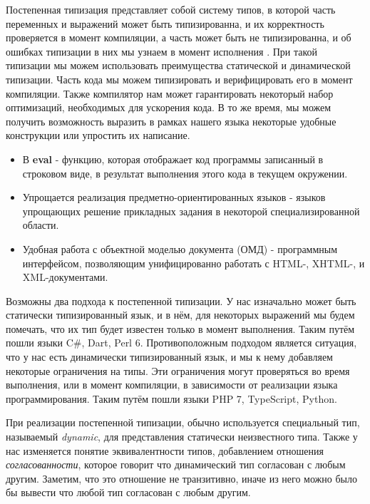 Постепенная типизация представляет собой систему типов, в которой часть переменных и выражений может быть типизированна, и их корректность проверяется в момент компиляции, а часть может быть не типизированна, и об ошибках типизации в них мы узнаем в момент исполнения \cite{gradual:siek2006gradual} \cite{gradual:siek2007gradual}. При такой типизации мы можем использовать преимущества статической и динамической типизации. Часть кода мы можем типизировать и верифицировать его в момент компиляции. Также компилятор нам может гарантировать некоторый набор оптимизаций, необходимых для ускорения кода. В то же время, мы можем получить возможность выразить в рамках нашего языка некоторые удобные конструкции или упростить их написание.

\begin{itemize}
    \item В \textbf{eval} - функцию, которая отображает код программы записанный в строковом виде, в результат выполнения этого кода в текущем окружении.
    \item Упрощается реализация предметно-ориентированных языков - языков упрощающих решение прикладных задания в некоторой специализированной области.
    \item Удобная работа с объектной моделью документа (ОМД) - программным интерфейсом, позволяющим унифицированно работать с HTML-, XHTML-, и XML-документами.
\end{itemize}

Возможны два подхода к постепенной типизации. У нас изначально может быть статически типизированный язык, и в нём, для некоторых выражений мы будем помечать, что их тип будет известен только в момент выполнения. Таким путём пошли языки C{\#}, Dart, Perl 6. Противоположным подходом является ситуация, что у нас есть динамически типизированный язык, и мы к нему добавляем некоторые ограничения на типы. Эти ограничения могут проверяться во время выполнения, или в момент компиляции, в зависимости от реализации языка программирования. Таким путём пошли языки PHP 7, TypeScript, Python.

При реализации постепенной типизации, обычно используется специальный тип, называемый \textit{dynamic}, для представления статически неизвестного типа. Также у нас изменяется понятие эквивалентности типов, добавлением отношения \textit{согласованности}, которое говорит что динамический тип согласован с любым другим. Заметим, что это отношение не транзитивно, иначе из него можно было бы вывести что любой тип согласован с любым другим.


